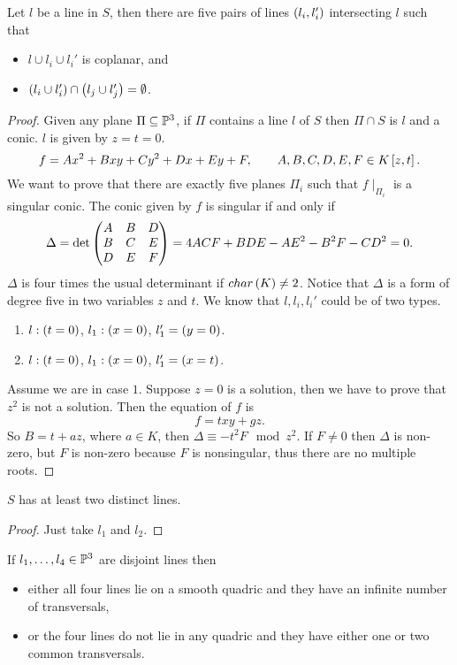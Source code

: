 
\begin{proposition}
Let $ l $ be a line in $ S $, then there are five pairs of lines $ \rb{l_i, l_i'} $ intersecting $ l $ such that
\begin{itemize}
\item $ l \cup l_i \cup l_i' $ is coplanar, and
\item $ \rb{l_i \cup l_i'} \cap \rb{l_j \cup l_j'} = \emptyset $.
\end{itemize}
\end{proposition}

\begin{proof}
Given any plane $ \Pi \subseteq \P^3 $, if $ \Pi $ contains a line $ l $ of $ S $ then $ \Pi \cap S $ is $ l $ and a conic. $ l $ is given by $ z = t = 0 $.
$$ f = Ax^2 + Bxy + Cy^2 + Dx + Ey + F, \qquad A, B, C, D, E, F \in K\sb{z, t}. $$
We want to prove that there are exactly five planes $ \Pi_i $ such that $ f \mid_{\Pi_i} $ is a singular conic. The conic given by $ f $ is singular if and only if
$$ \Delta = \det\threebythree{A}{B}{D}{B}{C}{E}{D}{E}{F} = 4ACF + BDE - AE^2 - B^2F - CD^2 = 0. $$
$ \Delta $ is four times the usual determinant if $ char\rb{K} \ne 2 $. Notice that $ \Delta $ is a form of degree five in two variables $ z $ and $ t $. We know that $ l, l_i, l_i' $ could be of two types.
\begin{enumerate}
\item $ l : \rb{t = 0} $, $ l_1 : \rb{x = 0} $, $ l_1' = \rb{y = 0} $.
\item $ l : \rb{t = 0} $, $ l_1 : \rb{x = 0} $, $ l_1' = \rb{x = t} $.
\end{enumerate}
Assume we are in case $ 1 $. Suppose $ z = 0 $ is a solution, then we have to prove that $ z^2 $ is not a solution. Then the equation of $ f $ is
$$ f = txy + gz. $$
So $ B = t + az $, where $ a \in K $, then $ \Delta \equiv -t^2F \mod z^2 $. If $ F \ne 0 $ then $ \Delta $ is non-zero, but $ F $ is non-zero because $ F $ is nonsingular, thus there are no multiple roots.
\end{proof}

\begin{corollary}
$ S $ has at least two distinct lines.
\end{corollary}

\begin{proof}
Just take $ l_1 $ and $ l_2 $.
\end{proof}

\begin{lemma}
If $ l_1, \dots, l_4 \in \P^3 $ are disjoint lines then
\begin{itemize}
\item either all four lines lie on a smooth quadric and they have an infinite number of transversals,
\item or the four lines do not lie in any quadric and they have either one or two common transversals.
\end{itemize}
\end{lemma}

